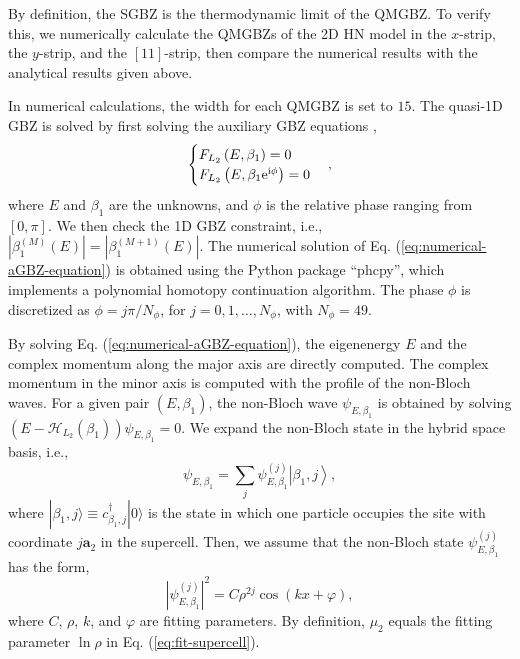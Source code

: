 \documentclass[pdflatex,sn-nature, iicol]{sn-jnl}%
\theoremstyle{thmstyleone}%
\theoremstyle{thmstyletwo}%
\theoremstyle{thmstylethree}%
\begin{document}
By definition, the SGBZ is the thermodynamic limit of the QMGBZ. To
verify this, we numerically calculate the QMGBZs of the 2D HN model
in the $x$-strip, the $y$-strip, and the $[11]$-strip, then compare
the numerical results with the analytical results given above.

In numerical calculations, the width for each QMGBZ is set to $15$.
The quasi-1D GBZ is solved by first solving the auxiliary GBZ equations
\cite{yangNonHermitianBulkBoundaryCorrespondence2020}, 
\begin{equation}
\begin{cases}
F_{L_{2}}\left(E,\beta_{1}\right)=0\\
F_{L_{2}}\left(E,\beta_{1}\mathrm{e}^{\mathrm{i}\phi}\right)=0
\end{cases},\label{eq:numerical-aGBZ-equation}
\end{equation}
where $E$ and $\beta_{1}$ are the unknowns, and $\phi$ is the relative
phase ranging from $[0,\pi]$. We then check the 1D GBZ constraint,
i.e., $|\beta_{1}^{(M)}(E)|=|\beta_{1}^{(M+1)}(E)|$. The numerical
solution of Eq. (\ref{eq:numerical-aGBZ-equation}) is obtained using
the Python package ``phcpy''\cite{verscheldeAlgorithm795PHCpack1999},
which implements a polynomial homotopy continuation algorithm. The
phase $\phi$ is discretized as $\phi=j\pi/N_{\phi}$, for $j=0,1,\dots,N_{\phi}$,
with $N_{\phi}=49$.

By solving Eq. (\ref{eq:numerical-aGBZ-equation}), the eigenenergy
$E$ and the complex momentum along the major axis are directly computed.
The complex momentum in the minor axis is computed with the profile
of the non-Bloch waves. For a given pair $(E,\beta_{1})$, the non-Bloch
wave $\psi_{E,\beta_{1}}$ is obtained by solving $\left(E-\mathcal{H}_{L_{2}}(\beta_{1})\right)\psi_{E,\beta_{1}}=0$.
We expand the non-Bloch state in the hybrid space basis, i.e., 
\begin{equation}
\psi_{E,\beta_{1}}=\sum_{j}\psi_{E,\beta_{1}}^{(j)}\left|\beta_{1},j\right>,\label{eq:expand-non-Bloch-on-a2}
\end{equation}
where $|\beta_{1},j\rangle\equiv c_{\beta_{1},j}^{\dagger}|0\rangle$
is the state in which one particle occupies the site with coordinate
$j\mathbf{a}_{2}$ in the supercell. Then, we assume that the non-Bloch
state $\psi_{E,\beta_{1}}^{(j)}$ has the form, 
\begin{equation}
\left|\psi_{E,\beta_{1}}^{(j)}\right|^{2}=C\rho^{2j}\cos\left(kx+\varphi\right),\label{eq:fit-supercell}
\end{equation}
where $C$, $\rho$, $k$, and $\varphi$ are fitting parameters.
By definition, $\mu_{2}$ equals the fitting parameter $\ln\rho$
in Eq. (\ref{eq:fit-supercell}).
\end{document}
